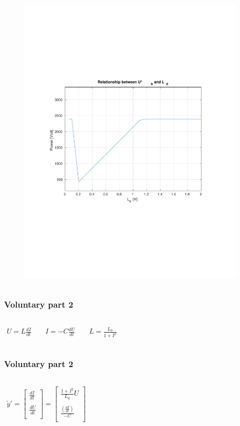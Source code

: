\documentclass[aspectratio=1610]{beamer}
\begin{document}
\begin{frame}
\begin{columns}
\begin{figure}
				\includegraphics[scale=0.4]{figs/voluntary_1_r.pdf}
			\end{figure}
	\end{columns}
\end{frame}
\begin{frame}
\frametitle{Voluntary part 2}
	\begin{columns}
		\huge
\begin{align*}
U =L\frac{dI}{dt}\quad\quad
I =-C\frac{dU}{dt}\quad\quad
L = \frac{L_{0}}{1+I^{2}}
\end{align*}
	\end{columns}
\end{frame}
\begin{frame}
\frametitle{Voluntary part 2}
	\begin{columns}
		\column{1\textwidth}
		\Huge
\begin{align*}
\tilde{y}'=
\begin{bmatrix}
\frac{dI}{dt}\\ \\ 
\frac{dU}{dt}\\
\end{bmatrix}
= \begin{bmatrix}
\frac{1+I^{2}}{L_{0}}{U}\\\\
\frac{\left(\frac{dI}{dt}\right)}{-C}\\
\end{bmatrix}
\end{align*}
	\end{columns}
\end{frame}
\end{document}
